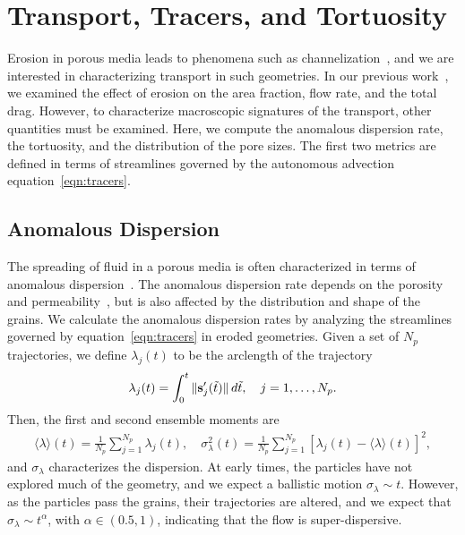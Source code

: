 \documentclass{jfm}
\begin{document}
\section{Transport, Tracers, and Tortuosity}
\label{sec:transport}
Erosion in porous media leads to phenomena such as
channelization~\citep{berhanu2012shape}, and we are interested in
characterizing transport in such geometries.  In our previous
work~\citep{qua-moo2018}, we examined the effect of erosion on the area
fraction, flow rate, and the total drag.  However, to characterize
macroscopic signatures of the transport, other quantities must be
examined.  Here, we compute the anomalous dispersion rate, the
tortuosity, and the distribution of the pore sizes.  The first two
metrics are defined in terms of streamlines governed by the autonomous
advection equation~\eqref{eqn:tracers}.

\subsection{Anomalous Dispersion}
\label{sec:dispersion}
The spreading of fluid in a porous media is often characterized in terms
of anomalous dispersion~\citep{kla-rad-sok2008, den-cor-sch-ber2004}.
The anomalous dispersion rate depends on the porosity and
permeability~\citep{koc-bra1988}, but is also affected by the
distribution and shape of the grains. We calculate the anomalous
dispersion rates by analyzing the streamlines governed by
equation~\eqref{eqn:tracers} in eroded geometries. Given a set of $N_p$
trajectories, we define $\lambda_j(t)$ to be the arclength of the
trajectory
\begin{align}
  \lambda_j(t) = \int_{0}^t \|\ss'_j(\tilde{t})\|\, d\tilde{t}, 
    \quad j=1,\ldots,N_p.
\end{align}
Then, the first and second ensemble moments are
\begin{align}
  \label{eqn:moments}
  \langle \lambda \rangle (t) = 
    \frac{1}{N_p} \sum_{j=1}^{N_p} \lambda_j(t), \quad 
    \sigma_\lambda^2(t) = \frac{1}{N_p} \sum_{j=1}^{N_p}
    \left[\lambda_j(t) - \langle \lambda \rangle(t) \right]^2,
\end{align}
and $\sigma_\lambda$ characterizes the dispersion.  At early times, the
particles have not explored much of the geometry, and we expect a
ballistic motion $\sigma_\lambda \sim t$.  However, as the particles
pass the grains, their trajectories are altered, and we expect that
$\sigma_\lambda \sim t^\alpha$, with $\alpha \in (0.5,1)$, indicating
that the flow is super-dispersive.
\end{document}
